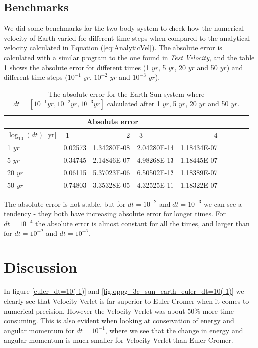 \documentclass[norsk,a4paper,12pt]{article}
\begin{document}
{\subsection{Benchmarks}
We did some benchmarks for the two-body system to check how the numerical velocity of Earth varied for different time steps when compared to the analytical velocity calculated in Equation (\ref{eq:AnalyticVel}). The absolute error is calculated with a similar program to the one found in \textit{Test Velocity}, and the table \ref{tab:Benchmark} shows the absolute error for different times (1 $yr$, 5 $yr$, 20 $yr$ and 50 $yr$) and different time steps ($10^{-1}$ $yr$, $10^{-2}$ $yr$ and $10^{-3}$ $yr$).
\begin{table}[H]
\centering
\caption{The absolute error for the Earth-Sun system where $dt=[10^{-1}yr,10^{-2}yr,10^{-3}yr]$ calculated after 1 $yr$, 5 $yr$, 20 $yr$ and 50 $yr$.}
\label{tab:Benchmark}
\begin{tabularx}{\textwidth}{lXrXrXrXr}
\toprule
\multicolumn{5}{c}{Absolute error}\\
\midrule
$\log_{10}(dt)$ [yr]        & -1 & -2 & -3 & -4 \\
\midrule
1 $yr$      & 0.02573  & 1.34280E-08  & 2.04280E-14 & 1.18434E-07 \\
5 $yr$      & 0.34745  & 2.14846E-07  & 4.98268E-13 & 1.18445E-07 \\
20 $yr$     & 0.06115  & 5.37023E-06  & 6.50502E-12 & 1.18389E-07 \\
50 $yr$     & 0.74803  & 3.35328E-05  & 4.32525E-11 & 1.18322E-07 \\
\bottomrule
\end{tabularx}
\end{table}
The absolute error is not stable, but for $dt=10^{-2}$ and $dt=10^{-3}$ we can see a tendency - they both have increasing absolute error for longer times. For $dt=10^{-4}$ the absolute error is almost constant for all the times, and larger than for $dt=10^{-2}$ and $dt=10^{-3}$.
\section{Discussion}
In figure \ref{euler_dt=10(-1)} and \ref{fig:oppg_3c_sun_earth_euler_dt=10(-1)} we clearly see that Velocity Verlet is far superior to Euler-Cromer when it comes to numerical precision. However the Velocity Verlet was about $50\%$ more time consuming. This is also evident when looking at conservation of energy and angular momentum for $dt = 10^{-1}$, where we see that the change in energy and angular momentum is much smaller for Velocity Verlet than Euler-Cromer.

}
\end{document}
